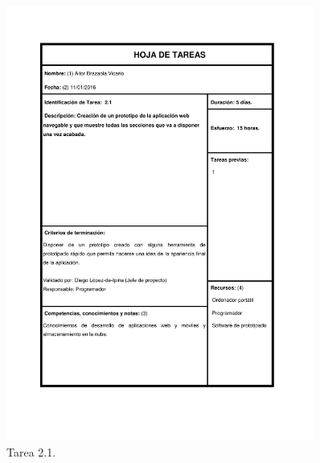 \documentclass{DeustoFDP}
\begin{document}
\begin{figure}[H]
	\centering
	\includegraphics[width=0.9\textwidth]{fig/Tareas/21}
	\caption{Tarea 2.1.}
	\label{fig:t21}
\end{figure}
\end{document}
